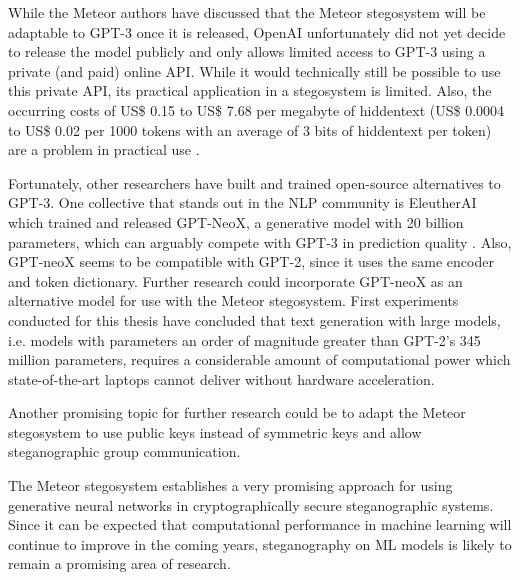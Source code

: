 While the Meteor authors have discussed that the Meteor stegosystem will be adaptable to GPT-3 once it is released, OpenAI unfortunately did not yet decide to release the model publicly and only allows limited access to GPT-3 using a private (and paid) online API.
While it would technically still be possible to use this private API, its practical application in a stegosystem is limited.
Also, the occurring costs of US\$ 0.15 to US\$ 7.68 per megabyte of hiddentext (US\$ 0.0004 to US\$ 0.02 per 1000 tokens with an average of 3 bits of hiddentext per token) are a problem in practical use \cite{OpenAIPricing2022}.

Fortunately, other researchers have built and trained open-source alternatives to GPT-3.
One collective that stands out in the NLP community is EleutherAI which trained and released GPT-NeoX, a generative model with 20 billion parameters, which can arguably compete with GPT-3 in prediction quality \cite{GPTneo2022}.
Also, GPT-neoX seems to be compatible with GPT-2, since it uses the same encoder and token dictionary.
Further research could incorporate GPT-neoX as an alternative model for use with the Meteor stegosystem.
First experiments conducted for this thesis have concluded that text generation with large models, i.e. models with parameters an order of magnitude greater than GPT-2's 345 million parameters, requires a considerable amount of computational power which state-of-the-art laptops cannot deliver without hardware acceleration.

Another promising topic for further research could be to adapt the Meteor stegosystem to use public keys instead of symmetric keys and allow steganographic group communication.

The Meteor stegosystem establishes a very promising approach for using generative neural networks in cryptographically secure steganographic systems.
Since it can be expected that computational performance in machine learning will continue to improve in the coming years, steganography on ML models is likely to remain a promising area of research.